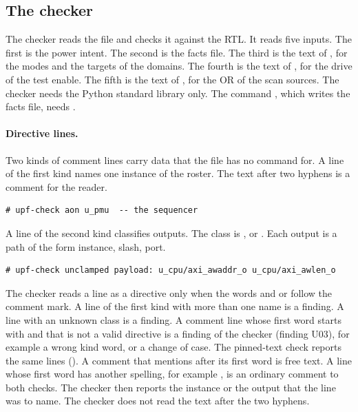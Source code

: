 \subsection{The checker}\label{tm:pd:phase5-soc-upf:checker}
The checker  reads the file and checks it against the RTL. It reads five inputs. The first is the power intent. The second is the facts file. The third is the text of , for the modes and the targets of the domains. The fourth is the text of , for the drive of the test enable. The fifth is the text of , for the OR of the scan sources. The checker needs the Python standard library only. The command , which writes the facts file, needs .

\paragraph{Directive lines.} Two kinds of comment lines carry data that the file has no command for. A line of the first kind names one instance of the roster. The text after two hyphens is a comment for the reader.
\begin{lstlisting}
# upf-check aon u_pmu  -- the sequencer
\end{lstlisting}
A line of the second kind classifies outputs. The class is ,  or . Each output is a path of the form instance, slash, port.
\begin{lstlisting}
# upf-check unclamped payload: u_cpu/axi_awaddr_o u_cpu/axi_awlen_o
\end{lstlisting}
The checker reads a line as a directive only when the words  and  or  follow the comment mark. A line of the first kind with more than one name is a finding. A line with an unknown class is a finding. A comment line whose first word starts with  and that is not a valid directive is a finding of the checker (finding U03), for example a wrong kind word,  or a change of case. The pinned-text check reports the same lines (). A comment that mentions  after its first word is free text. A line whose first word has another spelling, for example , is an ordinary comment to both checks. The checker then reports the instance or the output that the line was to name. The checker does not read the text after the two hyphens.

